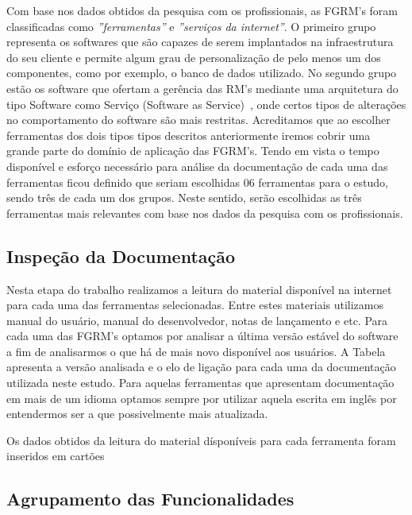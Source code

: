 Com base nos dados obtidos da pesquisa com os profissionais, as FGRM's foram
classificadas como \textit{''ferramentas''} e \textit{''serviços da internet''}.
O primeiro grupo representa os softwares que são capazes de serem implantados na
infraestrutura do seu cliente e permite algum grau de personalização de pelo
menos um dos componentes, como por exemplo, o banco de dados utilizado. No
segundo grupo estão os software que ofertam a gerência das RM's mediante uma
arquitetura do tipo Software como Serviço (Software as
Service)~\cite{fox2013engineering}, onde certos tipos de alterações no
comportamento do software são mais restritas. Acreditamos que ao escolher
ferramentas dos dois tipos tipos descritos anteriormente iremos cobrir uma
grande parte do domínio de aplicação das FGRM's. Tendo em vista o tempo
disponível e esforço necessário para análise da documentação de cada uma das
ferramentas ficou definido que seriam escolhidas 06 ferramentas para o estudo,
sendo três de cada um dos grupos. Neste sentido, serão escolhidas as três
ferramentas mais relevantes com base nos dados da pesquisa com os profissionais.

\subsection{Inspeção da Documentação}
\label{subsec:inspecao_doumentacao}

Nesta etapa do trabalho realizamos a leitura do material disponível na internet
para cada uma das ferramentas selecionadas. Entre estes materiais utilizamos
manual do usuário, manual do desenvolvedor, notas de lançamento e etc. Para cada
uma das FGRM's optamos por analisar a última versão estável do software a fim de
analisarmos o que há de mais novo disponível aos usuários. A Tabela apresenta a
versão analisada e o elo de ligação para cada uma da documentação utilizada
neste estudo. Para aquelas ferramentas que apresentam documentação em mais de um
idioma optamos sempre por utilizar aquela escrita em inglês por entendermos ser
a que possivelmente mais atualizada.


Os dados obtidos da leitura do material dísponíveis para cada ferramenta foram
inseridos em cartões
\subsection{Agrupamento das Funcionalidades}
\label{subsec:agrupamento_fucionalidades}

